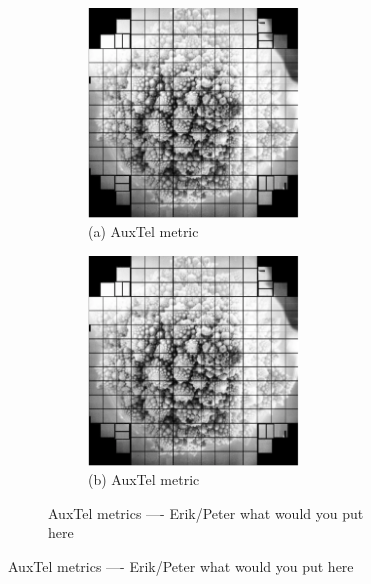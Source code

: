 \begin{figure}[!ht]
\begin{figure}[!ht]
\begin{subfigure}{.5\textwidth}
    \centering
    \includegraphics[width=0.8\textwidth]{figures/rubin_romanesco}
     \caption[\small]{(a) AuxTel metric }
\end{subfigure}%
\begin{subfigure}{.5\textwidth} 
    \centering
    \includegraphics[width=0.8\textwidth]{figures/rubin_romanesco}
    \caption[\small]{(b) AuxTel metric}
\end{subfigure}
\par\medskip %
\caption[short]{\color{red}AuxTel metrics ---- Erik/Peter what would you put here}
\label{fig:faro_auxtel_metrics}
\end{figure}



\end{figure}
